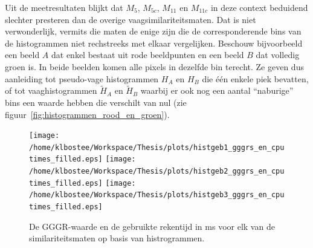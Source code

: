 Uit de meetresultaten blijkt dat $M_5$, $M_{5c}$, $M_{11}$ en $M_{11c}$ in deze context
beduidend slechter presteren dan de overige vaagsimilariteitsmaten. Dat is niet
verwonderlijk, vermits die maten de enige zijn die de corresponderende bins van de histogrammen 
niet rechstreeks met elkaar vergelijken. Beschouw bijvoorbeeld een beeld $A$ dat enkel bestaat
uit rode beeldpunten en een beeld $B$ dat volledig groen is. In beide beelden komen alle
pixels in dezelfde bin terecht. Ze geven dus aanleiding tot pseudo-vage histogrammen $H_A$ en $H_B$  
die \'e\'en enkele piek bevatten, of tot vaaghistogrammen $\widetilde{H}_A$ en $\widetilde{H}_B$ 
waarbij er ook nog een aantal ``naburige'' bins een waarde hebben die verschilt van nul 
(zie figuur~\ref{fig:histogrammen_rood_en_groen}). 
\begin{figure}[p]
\centering
\texttt{[image: /home/klbostee/Workspace/Thesis/plots/histgeb1\_gggrs\_en\_cputimes\_filled.eps]} 
\texttt{[image: /home/klbostee/Workspace/Thesis/plots/histgeb2\_gggrs\_en\_cputimes\_filled.eps]}
\texttt{[image: /home/klbostee/Workspace/Thesis/plots/histgeb3\_gggrs\_en\_cputimes\_filled.eps]}
\vspace{1pt}
\caption{\label{fig:histgeb_gggrs_en_cputimes}De GGGR-waarde en de gebruikte rekentijd in ms voor elk 
van de similariteitsmaten op basis van histrogrammen.}
\end{figure}
%
